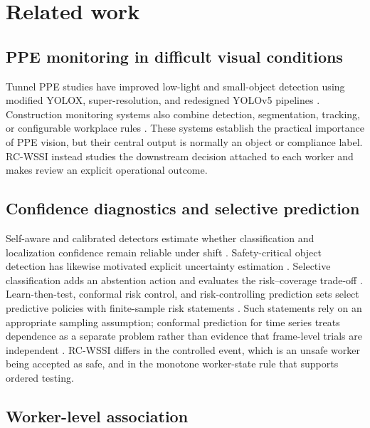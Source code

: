 \documentclass[iicol,pdflatex,sn-mathphys-num]{sn-jnl}
\begin{document}
\section{Related work}\label{sec:related}

\subsection{PPE monitoring in difficult visual conditions}

Tunnel PPE studies have improved low-light and small-object detection using modified YOLOX, super-resolution, and redesigned YOLOv5 pipelines \cite{wang2023lowlight,malaikrisanachalee2025espcn,wu2025enhanced}. Construction monitoring systems also combine detection, segmentation, tracking, or configurable workplace rules \cite{lee2023monitoring,pisu2024workplace}. These systems establish the practical importance of PPE vision, but their central output is normally an object or compliance label. RC-WSSI instead studies the downstream decision attached to each worker and makes review an explicit operational outcome.

\subsection{Confidence diagnostics and selective prediction}

Self-aware and calibrated detectors estimate whether classification and localization confidence remain reliable under shift \cite{oksuz2023selfaware,pathiraja2023multiclass}. Safety-critical object detection has likewise motivated explicit uncertainty estimation \cite{le2018uncertainty}. Selective classification adds an abstention action and evaluates the risk--coverage trade-off \cite{geifman2017selective}. Learn-then-test, conformal risk control, and risk-controlling prediction sets select predictive policies with finite-sample risk statements \cite{angelopoulos2021learntest,angelopoulos2022conformal,bates2021risk}. Such statements rely on an appropriate sampling assumption; conformal prediction for time series treats dependence as a separate problem rather than evidence that frame-level trials are independent \cite{xu2023timeseries}. RC-WSSI differs in the controlled event, which is an unsafe worker being accepted as safe, and in the monotone worker-state rule that supports ordered testing.

\subsection{Worker-level association}
\end{document}
